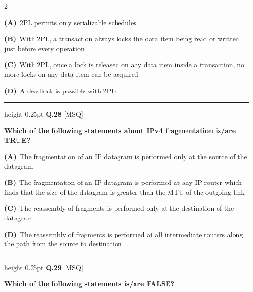\documentclass[a4paper,10pt,twoside]{article}
\begin{document}
\begin{multicols}{2}
\par\vspace{2pt}\noindent
\textbf{(A)}~2PL permits only serializable schedules\par\vspace{2pt}\noindent
\textbf{(B)}~With 2PL, a transaction always locks the data item being read or written just before every operation\par\vspace{2pt}\noindent
\textbf{(C)}~With 2PL, once a lock is released on any data item inside a transaction, no more locks on any data item can be acquired\par\vspace{2pt}\noindent
\textbf{(D)}~A deadlock is possible with 2PL
\par\vspace{6pt}\hrule height 0.25pt\vspace{6pt}
\noindent\textbf{Q.28} \hfill {\footnotesize\textsf{[MSQ]}}
\par\vspace{2pt}
{\bfseries Which of the following statements about IPv4 fragmentation is/are TRUE? \par}
\par\vspace{2pt}\noindent
\textbf{(A)}~The fragmentation of an IP datagram is performed only at the source of the datagram\par\vspace{2pt}\noindent
\textbf{(B)}~The fragmentation of an IP datagram is performed at any IP router which finds that the size of the datagram is greater than the MTU of the outgoing link\par\vspace{2pt}\noindent
\textbf{(C)}~The reassembly of fragments is performed only at the destination of the datagram\par\vspace{2pt}\noindent
\textbf{(D)}~The reassembly of fragments is performed at all intermediate routers along the path from the source to destination
\par\vspace{6pt}\hrule height 0.25pt\vspace{6pt}
\noindent\textbf{Q.29} \hfill {\footnotesize\textsf{[MSQ]}}
\par\vspace{2pt}
{\bfseries Which of the following statements is/are FALSE? \par}
\par\vspace{2pt}\noindent

\end{multicols}
\end{document}
